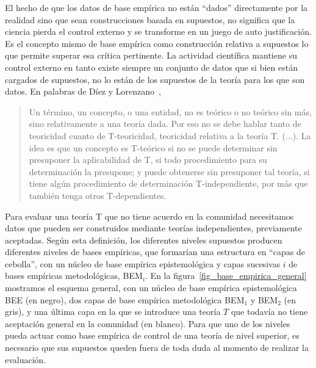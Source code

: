 \documentclass[a4paper,11pt]{book}
\theoremstyle{definition}
\begin{document}
El hecho de que los datos de base emp\'irica no est\'an ``dados'' directamente por la realidad sino que sean construcciones basada en supuestos, no significa que la ciencia pierda el control externo y se transforme en un juego de auto justificaci\'on.
%
Es el concepto mismo de base emp\'irica como construcci\'on relativa a supuestos lo que permite superar esa cr\'itica pertinente.
%
La actividad cient\'ifica mantiene su control externo en tanto existe siempre un conjunto de datos que si bien est\'an cargados de supuestos, no lo est\'an de los supuestos de la teor\'ia para los que son datos.
%
En palabras de D\'iez y Lorenzano~\cite{lorenzano2002-concepcionEstructuralista},
%
\begin{quotation}
Un t\'ermino, un concepto, o una entidad, no es te\'orico o no te\'orico sin m\'as, sino relativamente a una teor\'ia dada.
Por eso no se debe hablar tanto de teoricidad cuanto de T-teoricidad, teoricidad relativa a la teor\'ia T. (...).
La idea es que un concepto es T-te\'orico si no se puede determinar sin presuponer la aplicabilidad de T, si todo procedimiento para su determinaci\'on la presupone; y puede obtenerse sin presuponer tal teor\'ia, si tiene alg\'un procedimiento de determinaci\'on T-independiente, por m\'as que tambi\'en tenga otros T-dependientes.
\end{quotation}
%
Para evaluar una teor\'ia T que no tiene acuerdo en la comunidad necesitamos datos que pueden ser construidos mediante teor\'ias independientes, previamente aceptadas.
%
Seg\'un esta definici\'on, los diferentes niveles supuestos producen diferentes niveles de bases emp\'iricas, que formar\'ian una estructura en ``capas de cebolla'', con un n\'ucleo de base emp\'irica epistemol\'ogica y capas sucesivas $i$ de bases emp\'iricas metodol\'ogicas, BEM$_i$.
%
En la figura~\ref{fig_base_empirica_general} mostramos el esquema general, con un n\'ucleo de base emp\'irica epistemol\'ogica BEE (en negro), dos capas de base emp\'irica metodol\'ogica BEM$_1$ y BEM$_2$ (en gris), y una \'ultima capa en la que se introduce una teor\'ia $T$ que todav\'ia no tiene aceptaci\'on general en la comunidad (en blanco).
%
Para que uno de los niveles pueda actuar como base emp\'irica de control de una teor\'ia de nivel superior, es necesario que sus supuestos queden fuera de toda duda al momento de realizar la evaluaci\'on.
%
\end{document}
